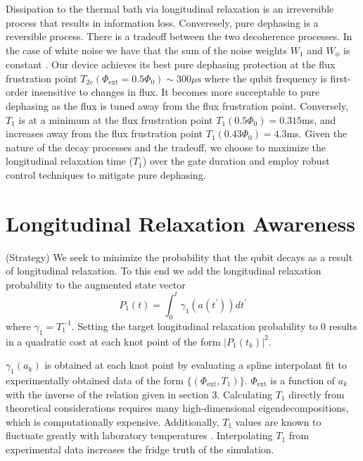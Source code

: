 \documentclass[
  amsfonts,
  amsmath,
  tbtags,
  amssymb,
  aps,
  nobibnotes,
  twocolumn,
]{revtex4-2}
\begin{document}
Dissipation to the thermal bath via longitudinal
relaxation is an irreversible process
that results in information loss.
Converesely, pure dephasing is a reversible process.
There is a tradeoff between the two decoherence processes. In the case of white
noise we have that the sum of the noise weights $W_{1}$ and $W_{\phi}$
is constant \cite{huang2020engineering}.
Our device achieves its best pure dephasing
protection at the flux frustration point
$T_{2e}(\Phi_{\textrm{ext}} = 0.5 \Phi_{0}) \sim 300 \mu\textrm{s}$
where the qubit frequency is first-order insensitive to changes in flux.
It becomes more succeptable to pure dephasing as the flux is tuned away from the flux
frustration point. Conversely, $T_{1}$ is at a minimum
at the flux frustration point $T_{1}(0.5 \Phi_{0}) = 0.315$ms,
and increases away from the flux frustration point
$T_{1}(0.43 \Phi_{0}) = 4.3$ms. Given the nature
of the decay processes and the tradeoff, we choose
to maximize the longitudinal relaxation time ($T_{1}$)
over the gate duration
and employ robust control techniques to mitigate
pure dephasing.


\section{Longitudinal Relaxation Awareness}
(Strategy) We seek to minimize the probability
that the qubit decays as a result of longitudinal
relaxation. To this end we add the
longitudinal relaxation probability
to the augmented state vector
\begin{equation}
  P_{1}(t) = \int_{0}^{t} \gamma_{1}(a(t^{\prime})) dt^{\prime}
\end{equation}
where $\gamma_{1} = T_{1}^{-1}$. Setting the target
longitudinal relaxation probability to 0 results in
a quadratic cost at each knot point
of the form ${\lvert P_{1}(t_{k}) \rvert}^{2}$.

$\gamma_{1}(a_{k})$
is obtained at each knot point by evaluating
a spline interpolant fit to
experimentally obtained data of the form
$\{(\Phi_{\textrm{ext}}, T_{1})\}$.
$\Phi_{\textrm{ext}}$ is a function of $a_{k}$
with the inverse of the relation given in section 3.
Calculating $T_{1}$ directly from theoretical
considerations requires many high-dimensional
eigendecompositions, which
is computationally expensive. Additionally,
$T_{1}$ values are known to fluctuate greatly
with laboratory temperatures \cite{klimov2018fluctuations}.
Interpolating $T_{1}$ from experimental data increases
the fridge truth of the simulation.
\end{document}
